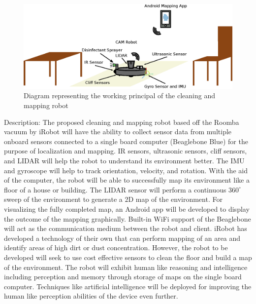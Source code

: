 \documentclass[fontsize=11pt, %
                             paper=a4, %
                             twoside, %
                             captions=tableheading,
                             index=totoc,
                             hyperref]{labbook}
\begin{document}
\begin{addmargin}[0cm]{0cm}
\begin{figure}[H]
\centering
\includegraphics[scale=0.7]{figs/inkscape/mappingRobotArchitecture.eps}
\caption{Diagram representing the working principal of the cleaning and mapping robot}
\end{figure}
\noindent
Description:
\smallbreak
The proposed cleaning and mapping robot based off the Roomba vacuum by iRobot will have the ability to collect sensor data from multiple onboard sensors connected to a single board computer (Beaglebone Blue) for the purpose of localization and mapping. IR sensors, ultrasonic sensors, cliff sensors, and LIDAR will help the robot to understand its environment better. The IMU and gyroscope will help to track orientation, velocity, and rotation. With the aid of the computer, the robot will be able to successfully map its environment like a floor of a house or building. The LIDAR sensor will perform a continuous $360^\circ$ sweep of the environment to generate a $2$D map of the environment. For visualizing the fully completed map, an Android app will be developed to display the outcome of the mapping graphically. Built-in WiFi support of the Beaglebone will act as the communication medium between the robot and client. iRobot has developed a technology of their own that can perform mapping of an area and identify areas of high dirt or dust concentration. However, the robot to be developed will seek to use cost effective sensors to clean the floor and build a map of the environment. The robot will exhibit human like reasoning and intelligence including perception and memory through storage of maps on the single board computer. Techniques like artificial intelligence will be deployed for improving the human like perception abilities of the device even further. 


\end{addmargin}
\end{document}
